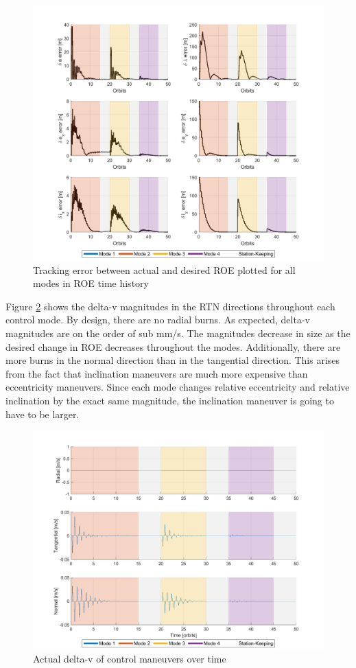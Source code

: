 \begin{figure}[H]
    \centering
    \includegraphics[width=0.75\linewidth]{sim/figures/PS6/ROE_error_over_time_modes_SV3.png}
    \caption{Tracking error between actual and desired ROE plotted for all modes in ROE time history}
    \label{fig:roe_error_time_modes}
\end{figure}

Figure \ref{fig:delta_v_modes} shows the delta-v magnitudes in the RTN directions throughout each control mode. By design, there are no radial burns. As expected, delta-v magnitudes are on the order of sub mm/s. The magnitudes decrease in size as the desired change in ROE decreases throughout the modes. Additionally, there are more burns in the normal direction than in the tangential direction. This arises from the fact that inclination maneuvers are much more expensive than eccentricity maneuvers. Since each mode changes relative eccentricity and relative inclination by the exact same magnitude, the inclination maneuver is going to have to be larger. 
\begin{figure}[H]
    \centering
    \includegraphics[width=0.75\linewidth]{sim/figures/PS6/delta_v_timeline_modes_SV3.png}
    \caption{Actual delta-v of control maneuvers over time}
    \label{fig:delta_v_modes}
\end{figure}


